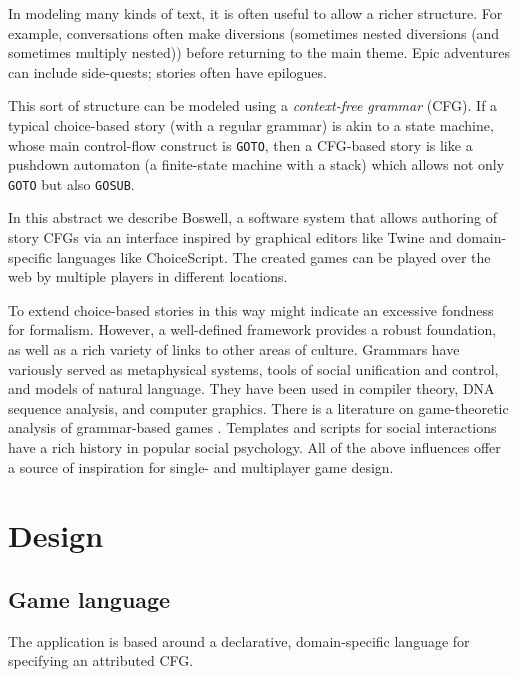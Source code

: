 \documentclass{acm_proc_article-sp}
\begin{document}
In modeling many kinds of text, it is often useful to allow a richer structure.
For example, conversations often make diversions (sometimes nested diversions (and sometimes multiply nested))
before returning to the main theme.
Epic adventures can include side-quests; stories often have epilogues.

This sort of structure can be modeled using a {\em context-free grammar} (CFG).
If a typical choice-based story (with a regular grammar) is akin to a state machine,
 whose main control-flow construct is {\tt GOTO},
then a CFG-based story is like a pushdown automaton (a finite-state machine with a stack)
 which allows not only {\tt GOTO} but also {\tt GOSUB}.

In this abstract we describe Boswell, a software system that allows authoring of story CFGs
via an interface inspired by graphical editors like Twine and domain-specific languages like ChoiceScript.
The created games can be played over the web by multiple players in different locations.

To extend choice-based stories in this way might indicate an excessive fondness for formalism.
However, a well-defined framework provides a robust foundation, as well as a rich variety of links to other areas of culture.
Grammars have variously served as metaphysical systems\cite{Ashtadhyayi,luhtala2005grammar},
tools of social unification and control\cite{AcademieFrancaise,RobertLowth},
and models of natural language\cite{Durbin98}.
They have been used in compiler theory\cite{aho2007compilers},
DNA sequence analysis\cite{Durbin98}, and
computer graphics\cite{LSystems}.
There is a literature on game-theoretic analysis of grammar-based games
\cite{DBLP:conf/icalp/EtessamiWY08}.
Templates and scripts for social interactions
 have a rich history in popular social psychology\cite{berne1964games,berne1972you}.
All of the above influences offer a source of inspiration for single- and multiplayer game design.

\section{Design}

\subsection{Game language}

The application is based around
a declarative, domain-specific language for specifying an attributed CFG.
\end{document}
